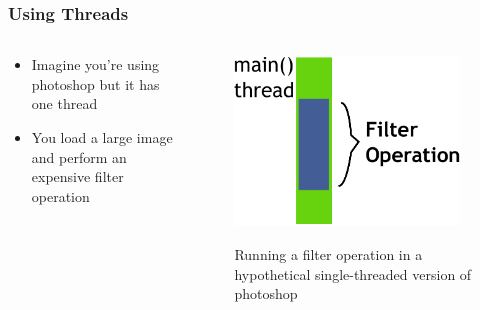 \documentclass{beamer}
\newcommand{\linespace}{\vskip 0.25cm}
\begin{document}
\begin{frame}
\frametitle{Using Threads}

\begin{columns}
	\begin{column}{0.5\textwidth}
		\linespace
		\begin{itemize}
		\item Imagine you're using photoshop but it has one thread
		\item You load a large image and perform an expensive filter operation
		\end{itemize}
		\end{column}
	\begin{column}{0.5\textwidth}
		\begin{figure}
		\includegraphics[width=0.95\textwidth]{Illustrations/ThreadExample_GUI_Part1}
		\label{fig:domains}
		\caption{Running a filter operation in a hypothetical single-threaded version of photoshop}
		\end{figure}
	\end{column}
\end{columns}

\end{frame}
\end{document}
